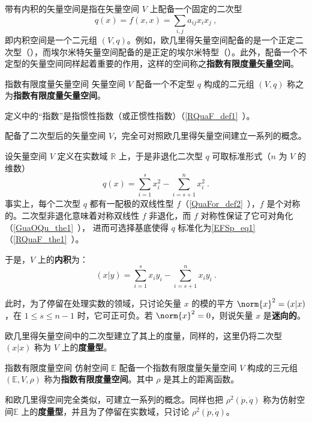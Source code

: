 
\begin{issues}
\issueDraft
\end{issues}

带有内积的矢量空间是指在矢量空间 $V$ 上配备一个固定的二次型
\begin{equation}
q(x)=f(x,x)=\sum_{i,j}a_{ij}x_ix_j~,
\end{equation}
 即内积空间是一个二元组 $(V,q)$。例如，欧几里得矢量空间配备的是一个正定二次型（），而埃尔米特矢量空间配备的是正定的埃尔米特型（）。此外，配备一个不定型的矢量空间同样起着重要的作用，这样的空间称之\textbf{指数有限度量矢量空间}。

 \begin{definition}{指数有限度量矢量空间}
 矢量空间 $V$ 配备一个不定型 $q$ 构成的二元组 $(V,q)$ 称之为\textbf{指数有限度量矢量空间}。
 \end{definition}
定义中的“指数”是指惯性指数（或正惯性指数）（\autoref{RQuaF_def1}~）。

配备了二次型后的矢量空间 $V$，完全可对照欧几里得矢量空间建立一系列的概念。

设矢量空间 $V$ 定义在实数域 $\mathbb R$ 上，于是非退化二次型 $q$ 可取标准形式（$n$ 为 $V$ 的维数）
\begin{equation}\label{EFSp_eq1}
q(x)=\sum_{i=1}^s x_i^2-\sum_{i=s+1}^n x_i^2~.
\end{equation}
事实上，每个二次型 $q$ 都有一配极的双线性型 $f$（\autoref{QuaFor_def2}~），$f$ 是个对称的。二次型非退化意味着对称双线性 $f$ 非退化，而 $f$ 对称性保证了它可对角化（\autoref{GuaOQu_the1}~）， 进而可选择基底使得 $q$ 标准化为\autoref{EFSp_eq1} （\autoref{RQuaF_the1}~）。

于是，$V$ 上的\textbf{内积}为：
\begin{equation}
(x|y)=\sum_{i=1}^{s}x_iy_i-\sum_{i=s+1}^{n}x_{i}y_i~.
\end{equation}

此时，为了停留在处理实数的领域，只讨论矢量 $x$ 的模的平方 $\norm{x}^2=(x|x)$，在 $1\leq s\leq n-1$ 时，它可正可负。若 $\norm{x}^2=0$，则说矢量 $x$ 是\textbf{迷向的}。

欧几里得矢量空间中的二次型建立了其上的度量，同样的，这里仍将二次型 $(x|x)$ 称为 $V$ 上的\textbf{度量型}。
\begin{definition}{指数有限度量空间}
 仿射空间 $\mathbb E$ 配备一个指数有限度量矢量空间 $V$ 构成的三元组 $(\mathbb E,V,\rho)$ 称为\textbf{指数有限度量空间}。其中 $\rho$ 是其上的距离函数。
 \end{definition}
 和欧几里得空间完全类似，可建立一系列的概念。同样也把 $\rho^2(\dot p,\dot q)$ 称为仿射空间$\mathbb E$ 上的\textbf{度量型}，并且为了停留在实数域，只讨论 $\rho^2(\dot p,\dot q)$。


